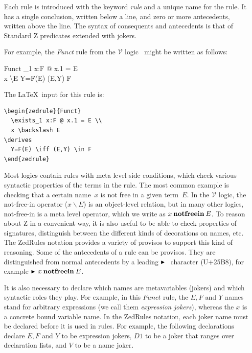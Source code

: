 \documentclass{entcs}
\newcommand{\V}{\mathcal{V}}
\begin{document}
Each rule is introduced with the keyword \emph{rule} and a unique name for
the rule.  It has a single conclusion, written below a line, and zero or
more antecedents, written above the line.  The syntax of consequents and
antecedents is that of Standard Z predicates extended with jokers.

For example, the \emph{Funct} rule from the $\V$
logic~\cite{brien:calculus-schemas-z00} might be written as follows:
\begin{zedrule}{Funct}
  \exists_1 x:F @ x.1 = E \\
  x \backslash E
\derives
  Y=F(E) \iff (E,Y) \in F
\end{zedrule}

The \LaTeX\ input for this rule is:
\begin{verbatim}
\begin{zedrule}{Funct}
  \exists_1 x:F @ x.1 = E \\
  x \backslash E
\derives
  Y=F(E) \iff (E,Y) \in F
\end{zedrule}
\end{verbatim}

Most logics contain rules with meta-level side conditions, which check
various syntactic properties of the terms in the rule.  The most common
example is checking that a certain name~$x$ is not free in a given
term~$E$.  In the $\V$ logic, the not-free-in operator ($x \backslash E$)
is an object-level relation, but in many other logics, not-free-in is a
meta level operator, which we write as $x \mathbin{\mathop{\mathstrut{\mbox{\textbf{notfreein}}}}\nolimits} E$.  To reason about Z
in a convenient way, it is also useful to be able to check properties of
signatures, distinguish between the different kinds of decorations on
names, etc.  The ZedRules notation provides a variety of provisos to
support this kind of reasoning.  Some of the antecedents of a rule can be
provisos.  They are distinguished from normal antecedents by a leading
$\proviso$ character (U+25B8), for example $\proviso x \notfreein E$.

It is also necessary to declare which names are metavariables
(jokers) and which syntactic roles they play.  For example, in
this $Funct$ rule, the $E,F$ and $Y$ names stand for arbitrary
expressions (we call them \emph{expression jokers}), whereas the $x$
is a concrete bound variable name.  In the ZedRules notation, each
joker name must be declared before it is used in rules.  For example,
the following declarations declare $E,F$ and $Y$ to be expression
jokers, $D1$ to be a joker that ranges over declaration lists, and
$V$ to be a name joker.
\end{document}
